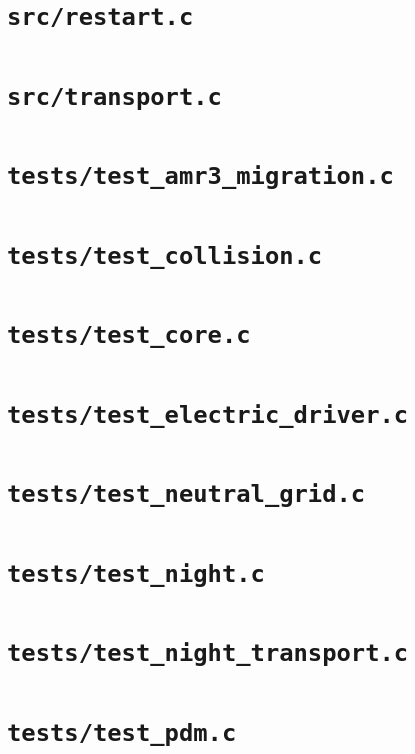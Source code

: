 \documentclass[9pt,a4paper]{extarticle}
\begin{document}
\section{\texttt{src/restart.c}}

\clearpage
\section{\texttt{src/transport.c}}

\clearpage
\section{\texttt{tests/test\_amr3\_migration.c}}

\clearpage
\section{\texttt{tests/test\_collision.c}}

\clearpage
\section{\texttt{tests/test\_core.c}}

\clearpage
\section{\texttt{tests/test\_electric\_driver.c}}

\clearpage
\section{\texttt{tests/test\_neutral\_grid.c}}

\clearpage
\section{\texttt{tests/test\_night.c}}

\clearpage
\section{\texttt{tests/test\_night\_transport.c}}

\clearpage
\section{\texttt{tests/test\_pdm.c}}

\clearpage
\end{document}
